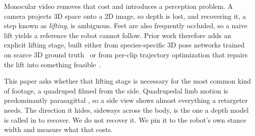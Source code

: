 \documentclass[letterpaper, 10 pt, conference]{ieeeconf}
\begin{document}
 
Monocular video removes that cost and introduces a perception problem. A camera projects 3D space onto a 2D image, so depth is lost, and recovering it, a step known as \emph{lifting}, is ambiguous. Feet are also frequently occluded, so a naive lift yields a reference the robot cannot follow. Prior work therefore adds an explicit lifting stage, built either from species-specific 3D pose networks trained on scarce 3D ground truth~\cite{zhao2025learning,zhang2023slomo} or from per-clip trajectory optimization that repairs the lift into something feasible~\cite{yoon2024stmr}.

This paper asks whether that lifting stage is necessary for the most common kind of footage, a quadruped filmed from the side. Quadrupedal limb motion is predominantly parasagittal \cite{fischer2002basic,hildebrand1989quadrupedal}, so a side view shows almost everything a retargeter needs. The direction it hides, sideways across the body, is the one a depth model is called in to recover. We do not recover it. We pin it to the robot's own stance width and measure what that costs.
\end{document}
